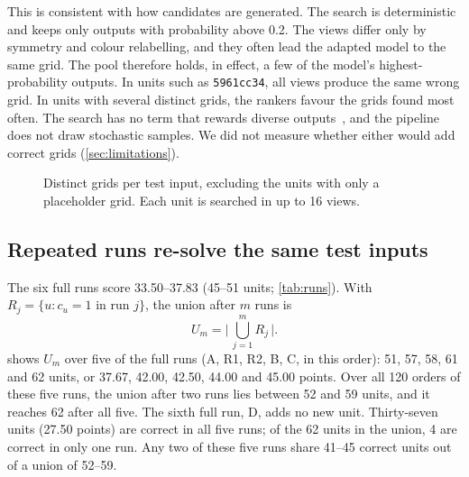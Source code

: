 \documentclass[11pt]{article}
\newcommand{\code}[1]{\texttt{#1}}
\newcommand{\R}[1]{R#1}
\begin{document}
This is consistent with how candidates are generated. The search is deterministic and keeps only outputs with probability above 0.2. The views differ only by symmetry and colour relabelling, and they often lead the adapted model to the same grid.
The pool therefore holds, in effect, a few of the model's highest-probability outputs. In units such as \code{5961cc34}, all views produce the same wrong grid. In units with several distinct grids, the rankers favour the grids found most often.
The search has no term that rewards diverse outputs~\citep[cf.][]{vijayakumar2016diverse}, and the pipeline does not draw stochastic samples. We did not measure whether either would add correct grids (\cref{sec:limitations}).

\begin{figure}[t]
\centering
{}
\caption{Distinct grids per test input, excluding the units with only a placeholder grid. Each unit is searched in up to 16 views.}
\label{fig:unique}
\end{figure}

\subsection{Repeated runs re-solve the same test inputs}
\label{sec:union}

The six full runs score 33.50--37.83 (45--51 units; \cref{tab:runs}). With $R_j = \{u : c_u = 1 \text{ in run } j\}$, the union after $m$ runs is
\begin{equation}
\label{eq:union}
U_m = \Big|\, \bigcup_{j=1}^{m} R_j \,\Big| .
\end{equation}
 shows $U_m$ over five of the full runs (A, \R{1}, \R{2}, B, C, in this order): 51, 57, 58, 61 and 62 units, or 37.67, 42.00, 42.50, 44.00 and 45.00 points.
Over all 120 orders of these five runs, the union after two runs lies between 52 and 59 units, and it reaches 62 after all five. The sixth full run, D, adds no new unit.
Thirty-seven units (27.50 points) are correct in all five runs; of the 62 units in the union, 4 are correct in only one run. Any two of these five runs share 41--45 correct units out of a union of 52--59.
\end{document}
